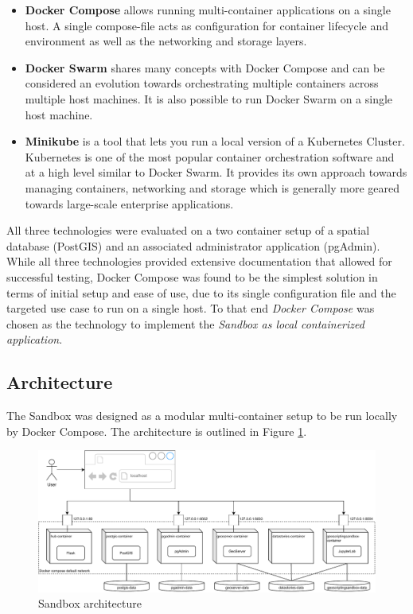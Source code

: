 \documentclass[11pt, a4paper, oneside, parskip=full-]{scrartcl}
\begin{document}
\begin{itemize}
  \item \textbf{Docker Compose} allows running multi-container applications on a
  single host. A single compose-file acts as configuration for container
  lifecycle and environment as well as the networking and storage layers.
  \item \textbf{Docker Swarm}\cite{dockerswarm} shares many concepts with Docker
  Compose and can be considered an evolution towards orchestrating multiple
  containers across multiple host machines. It is also possible to run Docker
  Swarm on a single host machine.
  \item \textbf{Minikube}\cite{minikube} is a tool that lets you run a local
  version of a Kubernetes Cluster. Kubernetes is one of the most popular
  container orchestration software and at a high level similar to Docker Swarm.
  It provides its own approach towards managing containers, networking and
  storage which is generally more geared towards large-scale enterprise
  applications.
\end{itemize}

All three technologies were evaluated on a two container setup of a spatial
database (PostGIS) and an associated administrator application (pgAdmin). While
all three technologies provided extensive documentation that allowed for
successful testing, Docker Compose was found to be the simplest solution in
terms of initial setup and ease of use, due to its single configuration file and
the targeted use case to run on a single host. To that end \emph{Docker Compose}
was chosen as the technology to implement the \emph{Sandbox as local
containerized application}.

\subsection{Architecture}
The Sandbox was designed as a modular multi-container setup to be run locally by
Docker Compose. The architecture is outlined in Figure \ref{fig:sandboxsetup}.

\begin{figure}[H]
  \centering
  \includegraphics[width=1\textwidth]{composeSetup}
  \caption{Sandbox architecture}
  \label{fig:sandboxsetup}
\end{figure}
\end{document}

